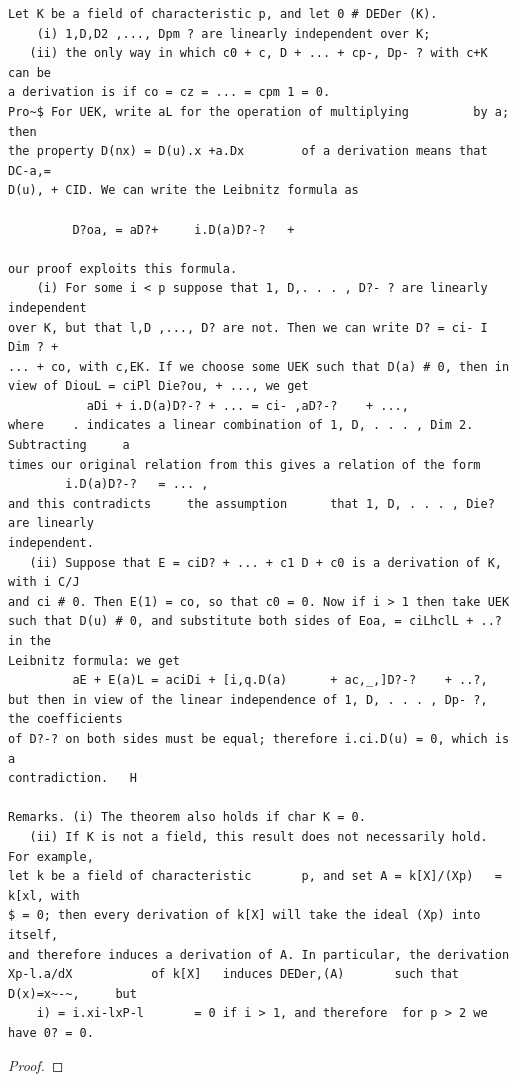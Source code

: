 \begin{theorem}\label{mcrt-auto-theorem-25-4}\uses{}
\begin{verbatim}
Let K be a field of characteristic p, and let 0 # DEDer (K).
    (i) 1,D,D2 ,..., Dpm ? are linearly independent over K;
   (ii) the only way in which c0 + c, D + ... + cp-, Dp- ? with c+K can be
a derivation is if co = cz = ... = cpm 1 = 0.
Pro~$ For UEK, write aL for the operation of multiplying         by a; then
the property D(nx) = D(u).x +a.Dx        of a derivation means that DC-a,=
D(u), + CID. We can write the Leibnitz formula as

         D?oa, = aD?+     i.D(a)D?-?   +

our proof exploits this formula.
    (i) For some i < p suppose that 1, D,. . . , D?- ? are linearly independent
over K, but that l,D ,..., D? are not. Then we can write D? = ci- I Dim ? +
... + co, with c,EK. If we choose some UEK such that D(a) # 0, then in
view of DiouL = ciPl Die?ou, + ..., we get
           aDi + i.D(a)D?-? + ... = ci- ,aD?-?    + ...,
where    . indicates a linear combination of 1, D, . . . , Dim 2. Subtracting     a
times our original relation from this gives a relation of the form
        i.D(a)D?-?   = ... ,
and this contradicts     the assumption      that 1, D, . . . , Die? are linearly
independent.
   (ii) Suppose that E = ciD? + ... + c1 D + c0 is a derivation of K, with i C/J
and ci # 0. Then E(1) = co, so that c0 = 0. Now if i > 1 then take UEK
such that D(u) # 0, and substitute both sides of Eoa, = ciLhclL + ..? in the
Leibnitz formula: we get
         aE + E(a)L = aciDi + [i,q.D(a)      + ac,_,]D?-?    + ..?,
but then in view of the linear independence of 1, D, . . . , Dp- ?, the coefficients
of D?-? on both sides must be equal; therefore i.ci.D(u) = 0, which is a
contradiction.   H

Remarks. (i) The theorem also holds if char K = 0.
   (ii) If K is not a field, this result does not necessarily hold. For example,
let k be a field of characteristic       p, and set A = k[X]/(Xp)   = k[xl, with
$ = 0; then every derivation of k[X] will take the ideal (Xp) into itself,
and therefore induces a derivation of A. In particular, the derivation
Xp-l.a/dX           of k[X]   induces DEDer,(A)       such that D(x)=x~-~,     but
    i) = i.xi-lxP-l       = 0 if i > 1, and therefore  for p > 2 we have 0? = 0.
\end{verbatim}
\end{theorem}
\begin{proof}
\notready
\end{proof}


